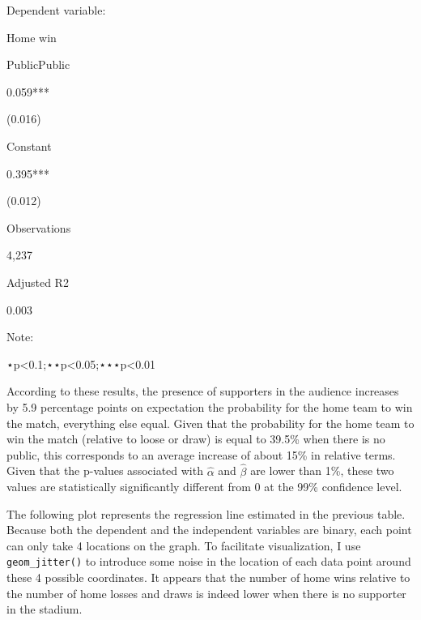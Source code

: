 \documentclass[
]{article}
\begin{document}
Dependent variable:

Home win

PublicPublic

0.059***

(0.016)

Constant

0.395***

(0.012)

Observations

4,237

Adjusted R2

0.003

Note:

⋆p\textless0.1;⋆⋆p\textless0.05;⋆⋆⋆p\textless0.01

According to these results, the presence of supporters in the audience
increases by 5.9 percentage points on expectation the probability for
the home team to win the match, everything else equal. Given that the
probability for the home team to win the match (relative to loose or
draw) is equal to 39.5\% when there is no public, this corresponds to an
average increase of about 15\% in relative terms. Given that the
p-values associated with \(\hat{\alpha}\) and \(\hat{\beta}\) are lower
than 1\%, these two values are statistically significantly different
from 0 at the 99\% confidence level.

The following plot represents the regression line estimated in the
previous table. Because both the dependent and the independent variables
are binary, each point can only take 4 locations on the graph. To
facilitate visualization, I use \texttt{geom\_jitter()} to introduce
some noise in the location of each data point around these 4 possible
coordinates. It appears that the number of home wins relative to the
number of home losses and draws is indeed lower when there is no
supporter in the stadium.
\end{document}
